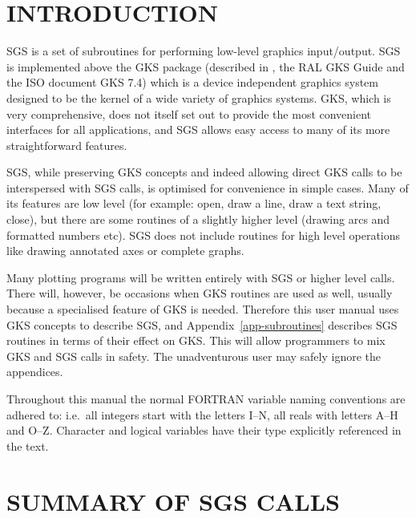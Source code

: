 \documentclass[11pt]{starlink}
\begin{document}
\scfrontmatter

\section{INTRODUCTION}

SGS is a set of subroutines for performing low-level graphics input/output.
SGS is implemented above the GKS package (described in ,
the RAL GKS Guide
and the ISO document GKS 7.4) which is a device independent graphics system
designed to be the kernel of a wide variety of graphics systems.
GKS, which is very comprehensive, does not itself set out to provide the most
convenient interfaces for all applications, and SGS allows easy access to many
of its more straightforward features.

SGS, while preserving GKS concepts and indeed allowing direct GKS calls to be
interspersed with SGS calls, is optimised for convenience in simple cases.
Many of its features are low level (for example: open, draw a line, draw a text
string, close), but there are some routines of a slightly higher level (drawing
arcs and formatted numbers etc).
SGS does not include routines for high level operations like drawing annotated
axes or complete graphs.

Many plotting programs will be written entirely with SGS or higher level calls.
There will, however, be occasions when GKS routines are used as well, usually
because a specialised feature of GKS is needed. Therefore this user manual uses
GKS concepts to describe SGS, and
Appendix~\ref{app-subroutines} describes SGS
routines in terms of their effect on GKS. This will allow programmers to mix
GKS and SGS calls in safety. The unadventurous user may safely ignore the
appendices.

Throughout this manual the normal FORTRAN variable naming conventions are
adhered to:  i.e.\ all integers start with the letters I--N, all reals with
letters A--H and O--Z. Character and logical variables have their type
explicitly referenced in the text.


\section{SUMMARY OF SGS CALLS}\label{sec-summary}
\end{document}
